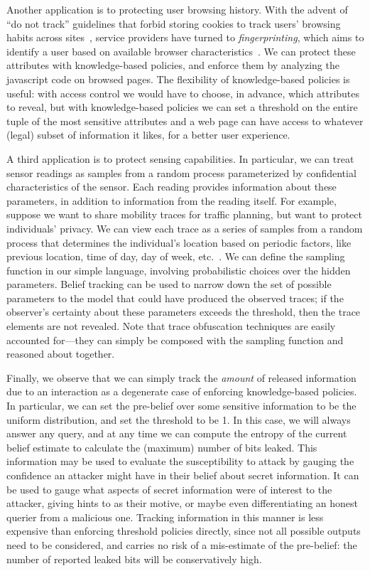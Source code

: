 Another application is to protecting user browsing history.  With the
advent of ``do not track'' guidelines that forbid storing cookies to
track users' browsing habits across sites~\cite{dnt}, service
providers have turned to \emph{fingerprinting}, which aims to identify
a user based on available browser
characteristics~\cite{boda11fingerprint}.  We can protect these
attributes with knowledge-based policies, and enforce them by
analyzing the javascript code on browsed pages.  The flexibility of
knowledge-based policies is useful: with access control we would have
to choose, in advance, which attributes to reveal, but with
knowledge-based policies we can set a threshold on the entire tuple of
the most sensitive attributes and a web page can have access to
whatever (legal) subset of information it likes, for a better user
experience.

A third application is to protect sensing capabilities.  In
particular, we can treat sensor readings as samples from a random
process parameterized by confidential characteristics of the sensor.
Each reading provides information about these parameters, in addition
to information from the reading itself.  For example, suppose we want
to share mobility traces for traffic planning, but want to protect
individuals' privacy.  We can view each trace as a series of samples
from a random process that determines the individual's location based
on periodic factors, like previous location, time of day, day of week,
etc.~\cite{shokri11quantifying}.  We can define the sampling function in our simple
language, involving probabilistic choices over the hidden parameters.
Belief tracking can be used to narrow down the set of possible
parameters to the model that could have produced the observed traces;
if the observer's certainty about these parameters exceeds the
threshold, then the trace elements are not revealed.  Note that trace
obfuscation techniques are easily accounted for---they can simply be
composed with the sampling function and reasoned about together.

Finally, we observe that we can simply track the \emph{amount} of
released information due to an interaction as a degenerate case of
enforcing knowledge-based policies.  In particular, we can set the
pre-belief over some sensitive information to be the uniform
distribution, and set the threshold to be 1.  In this case, we will
always answer any query, and at any time we can compute the entropy of
the current belief estimate to calculate the (maximum) number of bits
leaked.  This information may be used to evaluate the susceptibility
to attack by gauging the confidence an attacker might have in their
belief about secret information.  It can be used to gauge what aspects
of secret information were of interest to the attacker, giving hints
to as their motive, or maybe even differentiating an honest querier
from a malicious one.  Tracking information in this manner is less
expensive than enforcing threshold policies directly, since not all
possible outputs need to be considered, and carries no risk of a
mis-estimate of the pre-belief: the number of reported leaked bits
will be conservatively high.

